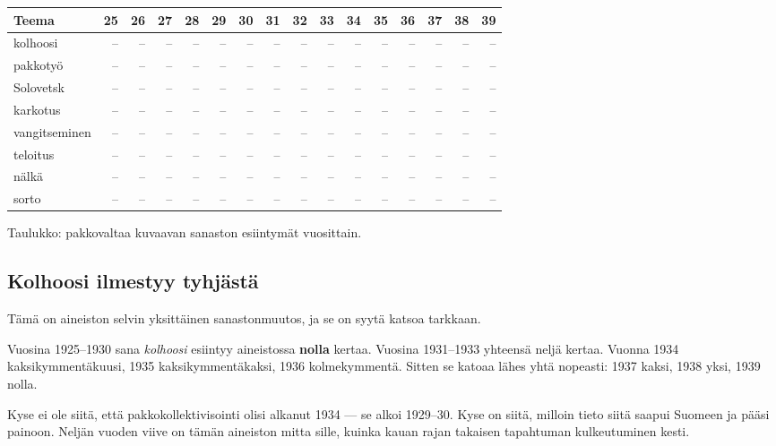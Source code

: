\documentclass[10pt,a4paper]{article}
\begin{document}
\begin{center}\small
\begin{tabular}{@{}lrrrrrrrrrrrrrrr@{}}
\toprule
\textbf{Teema} & \textbf{25} & \textbf{26} & \textbf{27} & \textbf{28} & \textbf{29} & \textbf{30} & \textbf{31} & \textbf{32} & \textbf{33} & \textbf{34} & \textbf{35} & \textbf{36} & \textbf{37} & \textbf{38} & \textbf{39}\\
\midrule
kolhoosi & -- & -- & -- & -- & -- & -- & -- & -- & -- & -- & -- & -- & -- & -- & --\\
pakkotyö & -- & -- & -- & -- & -- & -- & -- & -- & -- & -- & -- & -- & -- & -- & --\\
Solovetsk & -- & -- & -- & -- & -- & -- & -- & -- & -- & -- & -- & -- & -- & -- & --\\
karkotus & -- & -- & -- & -- & -- & -- & -- & -- & -- & -- & -- & -- & -- & -- & --\\
vangitseminen & -- & -- & -- & -- & -- & -- & -- & -- & -- & -- & -- & -- & -- & -- & --\\
teloitus & -- & -- & -- & -- & -- & -- & -- & -- & -- & -- & -- & -- & -- & -- & --\\
nälkä & -- & -- & -- & -- & -- & -- & -- & -- & -- & -- & -- & -- & -- & -- & --\\
sorto & -- & -- & -- & -- & -- & -- & -- & -- & -- & -- & -- & -- & -- & -- & --\\
\bottomrule
\end{tabular}
\end{center}
{\footnotesize Taulukko: pakkovaltaa kuvaavan sanaston esiintymät vuosittain.}

\subsection{Kolhoosi ilmestyy tyhjästä}

Tämä on aineiston selvin yksittäinen sanastonmuutos, ja se on syytä katsoa tarkkaan.

Vuosina 1925--1930 sana \emph{kolhoosi} esiintyy aineistossa \textbf{nolla} kertaa.
Vuosina 1931--1933 yhteensä neljä kertaa. Vuonna 1934 kaksikymmentäkuusi, 1935
kaksikymmentäkaksi, 1936 kolmekymmentä. Sitten se katoaa lähes yhtä nopeasti: 1937
kaksi, 1938 yksi, 1939 nolla.

Kyse ei ole siitä, että pakkokollektivisointi olisi alkanut 1934 --- se alkoi 1929--30.
Kyse on siitä, milloin tieto siitä saapui Suomeen ja pääsi painoon. Neljän vuoden
viive on tämän aineiston mitta sille, kuinka kauan rajan takaisen tapahtuman
kulkeutuminen kesti.
\end{document}
